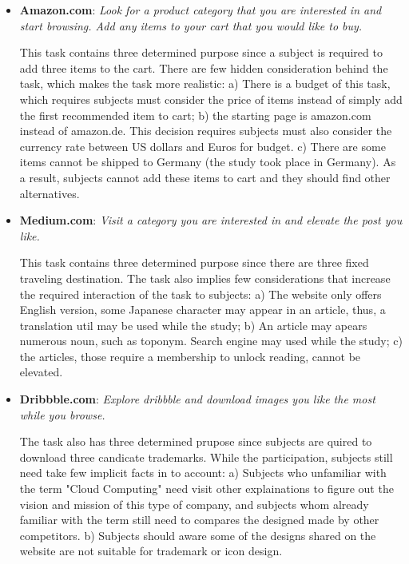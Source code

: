 \begin{itemize}
    \item \textbf{Amazon.com}: \emph{Look for a product category that you are interested in and start browsing. 
        Add any items to your cart that you would like to buy.}

        This task contains three determined purpose since a subject is required to add three items
        to the cart. There are few hidden consideration behind the task, which makes the task
        more realistic: a) There is a budget of this task, which requires subjects must consider the
        price of items instead of simply add the first recommended item to cart; 
        b) the starting page is amazon.com instead of amazon.de. This decision requires
        subjects must also consider the currency rate between US dollars and Euros for budget.
        c) There are some items cannot be shipped to Germany (the study took place in Germany).
        As a result, subjects cannot add these items to cart and they should find other alternatives.

    \item \textbf{Medium.com}: \emph{Visit a category you are interested in and elevate the post you like.}

        This task contains three determined purpose since there are three fixed traveling destination.
        The task also implies few considerations that increase the required interaction of the task to subjects:
        a) The website only offers English version, some Japanese character may appear in an article,
        thus, a translation util may be used while the study;
        b) An article may apears numerous noun, such as toponym. Search engine may used while the study;
        c) the articles, those require a membership to unlock reading, cannot be elevated. 


    \item \textbf{Dribbble.com}: \emph{Explore dribbble and download images you like the most while you browse.}

        The task also has three determined prupose since subjects are quired to download three candicate trademarks.
        While the participation, subjects still need take few implicit facts in to account:
        a) Subjects who unfamiliar with the term "Cloud Computing" need visit other explainations to figure out
        the vision and mission of this type of company, and subjects whom already familiar with the term
        still need to compares the designed made by other competitors.
        b) Subjects should aware some of the designs shared on the website are not suitable for trademark or icon design.
\end{itemize}

